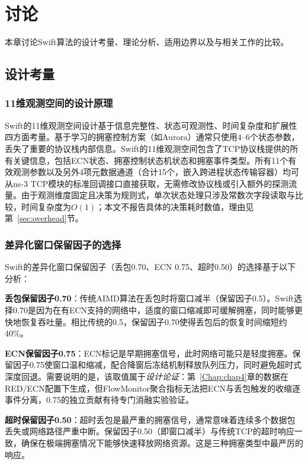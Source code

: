 \chapter{讨论}\label{Chap:chap5}

本章讨论Swift算法的设计考量、理论分析、适用边界以及与相关工作的比较。

\section{设计考量}

\subsection{11维观测空间的设计原理}

Swift的11维观测空间设计基于信息完整性、状态可观测性、时间复杂度和扩展性四方面考量。基于学习的拥塞控制方案（如Aurora）通常只使用4--6个状态参数，丢失了重要的协议栈内部信息。Swift的11维观测空间包含了TCP协议栈提供的所有关键信息，包括ECN状态、拥塞控制状态机状态和拥塞事件类型。所有11个有效观测参数以及另外4项元数据通道（合计15个，嵌入跨进程状态传输容器）均可从ns-3 TCP模块的标准回调接口直接获取，无需修改协议栈或引入额外的探测流量。由于观测维度固定且决策为规则式，单次状态处理只涉及常数次字段读取与比较，时间复杂度为$O(1)$；本文不报告具体的决策耗时数值，理由见第~\ref{sec:overhead}节。

\subsection{差异化窗口保留因子的选择}

Swift的差异化窗口保留因子（丢包0.70、ECN 0.75、超时0.50）的选择基于以下分析：

\textbf{丢包保留因子0.70}：传统AIMD算法在丢包时将窗口减半（保留因子0.5）。Swift选择0.70是因为在有ECN支持的网络中，适度的窗口缩减即可缓解拥塞，同时能够更快地恢复吞吐量。相比传统的0.5，保留因子0.70使得丢包后的恢复时间缩短约40\%。

\textbf{ECN保留因子0.75}：ECN标记是早期拥塞信号，此时网络可能只是轻度拥塞。保留因子0.75使窗口温和缩减，配合降窗后冻结机制释放队列压力，同时避免超时式深度回退。需要说明的是，该取值属于\emph{设计论证}：第~\ref{Chap:chap4}章的数据在RED/ECN配置下生成，但FlowMonitor聚合指标无法把ECN与丢包触发的收缩逐事件分离，0.75的独立贡献有待专门消融实验验证。

\textbf{超时保留因子0.50}：超时丢包是最严重的拥塞信号，通常意味着连续多个数据包丢失或网络路径严重中断。保留因子0.50（即窗口减半）与传统TCP的超时响应一致，确保在极端拥塞情况下能够快速释放网络资源。这是三种拥塞类型中最严厉的响应。

